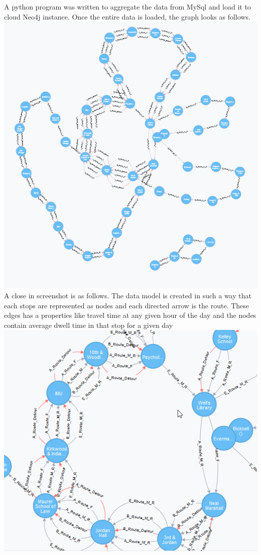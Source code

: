 \documentclass[12pt]{article}\usepackage[]{graphicx}\usepackage[]{color}
\begin{document}
A python program was written to aggregate the data from MySql and load it to cloud Neo4j instance. Once the entire data is loaded, the graph looks as follows.\\
\includegraphics[scale=0.8]{resources/neo4j1}\\[1cm] 
A close in screenshot is as follows. The data model is created in such a way that each stops are represented as nodes and each directed arrow is the route. These edges has a properties like travel time at any given hour of the day and the nodes contain average dwell time in that stop for a given day\\
\includegraphics[scale=0.8]{resources/neo4j2}\\[1cm] 
\end{document}
